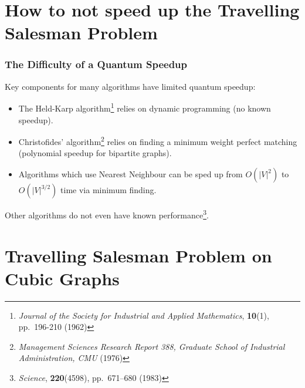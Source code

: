 \documentclass[]{beamer}
\begin{document}
\section{How to not speed up the Travelling Salesman Problem}

\begin{frame}
\frametitle{The Difficulty of a Quantum Speedup}

Key components for many algorithms have limited quantum speedup:

\begin{itemize}
\item The Held-Karp algorithm\footnote{{\em Journal of the Society for Industrial and Applied Mathematics}, {\bf 10}(1), pp.\ 196-210 (1962)} relies on dynamic programming (no known speedup).
\item Christofides' algorithm\footnote{{\em Management Sciences Research Report 388, Graduate School of Industrial Administration, CMU} (1976)} relies on finding a minimum weight perfect matching (polynomial speedup for bipartite graphs).
\item Algorithms which use Nearest Neighbour can be sped up from $O(|V|^2)$ to $O(|V|^{3/2})$ time via minimum finding.
\end{itemize}

Other algorithms do not even have known performance\footnote{{\em Science}, {\bf 220}(4598), pp.\ 671--680 (1983)}.
\end{frame}

\section{Travelling Salesman Problem on Cubic Graphs}
\end{document}
